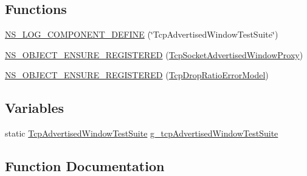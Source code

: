 \subsection*{Functions}
\begin{DoxyCompactItemize}
\item 
\hyperlink{tcp-advertised-window-test_8cc_a082a0cde0865aeef5ef9053e7bc4ae5a}{N\+S\+\_\+\+L\+O\+G\+\_\+\+C\+O\+M\+P\+O\+N\+E\+N\+T\+\_\+\+D\+E\+F\+I\+NE} (\char`\"{}Tcp\+Advertised\+Window\+Test\+Suite\char`\"{})
\item 
\hyperlink{tcp-advertised-window-test_8cc_a6c8c99ba4bd84669771df5cbf08f3194}{N\+S\+\_\+\+O\+B\+J\+E\+C\+T\+\_\+\+E\+N\+S\+U\+R\+E\+\_\+\+R\+E\+G\+I\+S\+T\+E\+R\+ED} (\hyperlink{classTcpSocketAdvertisedWindowProxy}{Tcp\+Socket\+Advertised\+Window\+Proxy})
\item 
\hyperlink{tcp-advertised-window-test_8cc_a2196bcb8ec739b412c8669f083ae5dd6}{N\+S\+\_\+\+O\+B\+J\+E\+C\+T\+\_\+\+E\+N\+S\+U\+R\+E\+\_\+\+R\+E\+G\+I\+S\+T\+E\+R\+ED} (\hyperlink{classTcpDropRatioErrorModel}{Tcp\+Drop\+Ratio\+Error\+Model})
\end{DoxyCompactItemize}
\subsection*{Variables}
\begin{DoxyCompactItemize}
\item 
static \hyperlink{classTcpAdvertisedWindowTestSuite}{Tcp\+Advertised\+Window\+Test\+Suite} \hyperlink{tcp-advertised-window-test_8cc_ae8a9071de0336a21fbd33f3159d4a559}{g\+\_\+tcp\+Advertised\+Window\+Test\+Suite}
\end{DoxyCompactItemize}


\subsection{Function Documentation}
